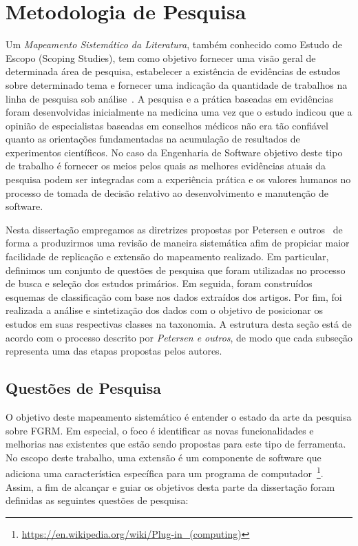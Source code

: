 \section{Metodologia de Pesquisa}
\label{sec:map-metodologia}

Um \textit{Mapeamento Sistemático da Literatura}, também conhecido como Estudo
de Escopo (Scoping Studies), tem como objetivo fornecer uma visão geral de
determinada área de pesquisa, estabelecer a existência de evidências de estudos
sobre determinado tema e fornecer uma indicação da quantidade de trabalhos na
linha de pesquisa sob
análise~\cite{keele2007guidelines,wohlin2012experimentation}. A pesquisa e a
prática baseadas em evidências foram desenvolvidas inicialmente na medicina uma
vez que o estudo indicou que a opinião de especialistas baseadas em conselhos
médicos não era tão confiável quanto as orientações fundamentadas na acumulação
de resultados de experimentos científicos. No caso da Engenharia de Software
objetivo deste tipo de trabalho é fornecer os meios pelos quais as melhores
evidências atuais da pesquisa podem ser integradas com a experiência prática e
os valores humanos no processo de tomada de decisão relativo ao desenvolvimento
e manutenção de software.

Nesta dissertação empregamos as diretrizes propostas por Petersen e
outros~\cite{Petersen2008} de forma a produzirmos uma revisão de maneira
sistemática afim de propiciar maior facilidade de replicação e extensão do
mapeamento realizado. Em particular, definimos um conjunto de questões de
pesquisa que foram utilizadas no processo de busca e seleção dos estudos
primários. Em seguida, foram construídos esquemas de classificação com base nos
dados extraídos dos artigos. Por fim, foi realizada a análise e sintetização dos
dados com o objetivo de posicionar os estudos em suas respectivas classes na
taxonomia. A estrutura desta seção está de acordo com o processo descrito por
\textit{Petersen e outros}, de modo que cada subseção representa uma das etapas
propostas pelos autores.

\subsection{Questões de Pesquisa}
\label{subsec:map-questoes-de-pesquisa}

O objetivo deste mapeamento sistemático é entender o estado da arte da pesquisa
sobre FGRM\@. Em especial, o foco é identificar as novas funcionalidades e
melhorias nas existentes que estão sendo propostas para este tipo de ferramenta.
No escopo deste trabalho, uma extensão é um componente de software que adiciona
uma característica específica para um programa de
computador~\footnote{\url{https://en.wikipedia.org/wiki/Plug-in_(computing)}}.
Assim, a fim de alcançar e guiar os objetivos desta parte da dissertação foram
definidas as seguintes questões de pesquisa:

